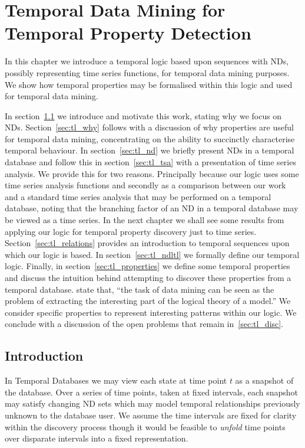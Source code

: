 \chapter{Temporal Data Mining for Temporal Property
Detection}\label{chap:templog}

In this chapter we introduce a temporal logic based upon sequences
with NDs, possibly representing time series functions, for temporal data
mining purposes. We show how temporal properties may be formalised
within this logic and used for temporal data mining.
\smallskip

In section~\ref{sec:tl_intro} we introduce and motivate this
work, stating why we focus on NDs. Section~\ref{sec:tl_why} follows
with a discussion of why
properties are useful for temporal data mining, concentrating on the
ability to succinctly characterise temporal behaviour. In
section~\ref{sec:tl_nd} we briefly present NDs in a temporal database
and follow this in section~\ref{sec:tl_tsa} with a presentation of
time series analysis. We provide this for two reasons. Principally
because our logic uses some time series analysis functions and
secondly as a comparison between our work and a standard time series
analysis that may be performed on a temporal database, noting that the
branching factor of an ND
in a temporal database may be viewed as a time series. In the next
chapter we shall see some results from applying our logic for temporal
property discovery just to time series.  Section~\ref{sec:tl_relations}
provides an introduction to temporal sequences upon which our logic is
based. In section~\ref{sec:tl_ndltl} we formally define our temporal
logic. Finally, in section~\ref{sec:tl_properties} we define some temporal
properties and discuss the intuition behind attempting to discover
these properties from a temporal database. \cite{jmw96} state that,
``the task of data mining can be seen as the problem of extracting the
interesting part of the logical theory of a model.'' We consider
specific properties to represent interesting patterns within our logic.
We conclude with a
discussion of the open problems that remain in~\ref{sec:tl_disc}.

\section{Introduction}\label{sec:tl_intro}

In Temporal Databases we
may view each state at time point $t$ as a snapshot of the database. 
Over a series of time points, taken at fixed intervals, each snapshot 
may satisfy changing
ND sets which may model temporal relationships previously unknown to
the database user. We assume the time intervals are fixed for clarity
within the discovery process though it would be feasible to {\em unfold}
time points over disparate intervals into a fixed representation.

